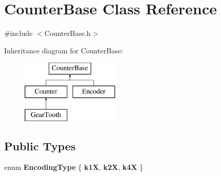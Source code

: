 \hypertarget{classCounterBase}{\section{\-Counter\-Base \-Class \-Reference}
\label{classCounterBase}
}


{\ttfamily \#include $<$\-Counter\-Base.\-h$>$}

\-Inheritance diagram for \-Counter\-Base\-:\begin{figure}[H]
\begin{center}
\leavevmode
\includegraphics[height=3.000000cm]{classCounterBase}
\end{center}
\end{figure}
\subsection*{\-Public \-Types}
\begin{DoxyCompactItemize}
\item 
enum {\bfseries \-Encoding\-Type} \{ {\bfseries k1\-X}, 
{\bfseries k2\-X}, 
{\bfseries k4\-X}
 \}
\end{DoxyCompactItemize}
